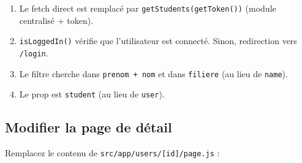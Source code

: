 \documentclass[11pt,a4paper]{article}
\begin{document}
\begin{retenirbox}
\begin{enumerate}[nosep]
\item Le fetch direct est remplacé par \texttt{getStudents(getToken())} (module centralisé + token).
\item \texttt{isLoggedIn()} vérifie que l'utilisateur est connecté. Sinon, redirection vers \texttt{/login}.
\item Le filtre cherche dans \texttt{prenom + nom} et dans \texttt{filiere} (au lieu de \texttt{name}).
\item Le prop est \texttt{student} (au lieu de \texttt{user}).
\end{enumerate}
\end{retenirbox}

\subsection{Modifier la page de détail}

Remplacez le contenu de \texttt{src/app/users/[id]/page.js} :
\end{document}
